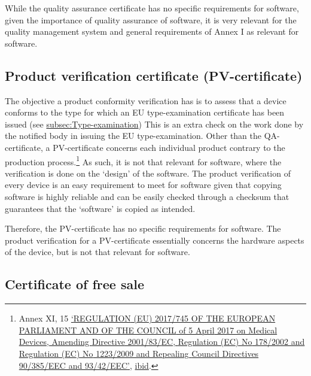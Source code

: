 \documentclass[
]{scrartcl}
\begin{document}
While the quality assurance certificate has no specific requirements for software, given the importance of quality assurance of software, it is very relevant for the quality management system and general requirements of Annex I as relevant for software.

\hypertarget{product-verification-certificate-pv-certificate}{%
\subsection{Product verification certificate (PV-certificate)}\label{product-verification-certificate-pv-certificate}}

The objective a product conformity verification has is to assess that a device conforms to the type for which an EU type-examination certificate has been issued (see \protect\hyperlink{subsec:Type-examination}{subsec:Type-examination}) This is an extra check on the work done by the notified body in issuing the EU type-examination. Other than the QA-certificate, a PV-certificate concerns each individual product contrary to the production process.\footnote{Annex XI, 15 \protect\hyperlink{ref-REGULATIONEU2017a}{{`{REGULATION} ({EU}) 2017/745 {OF THE EUROPEAN PARLIAMENT AND OF THE COUNCIL} of 5 {April} 2017 on Medical Devices, Amending {Directive} 2001/83/{EC}, {Regulation} ({EC}) {No} 178/2002 and {Regulation} ({EC}) {No} 1223/2009 and Repealing {Council Directives} 90/385/{EEC} and 93/42/{EEC}'}}, \protect\hyperlink{ref-REGULATIONEU2017a}{ibid}.} As such, it is not that relevant for software, where the verification is done on the `design' of the software. The product verification of every device is an easy requirement to meet for software given that copying software is highly reliable and can be easily checked through a checksum that guarantees that the `software' is copied as intended.

Therefore, the PV-certificate has no specific requirements for software. The product verification for a PV-certificate essentially concerns the hardware aspects of the device, but is not that relevant for software.

\hypertarget{certificate-of-free-sale}{%
\subsection{Certificate of free sale}\label{certificate-of-free-sale}}
\end{document}
